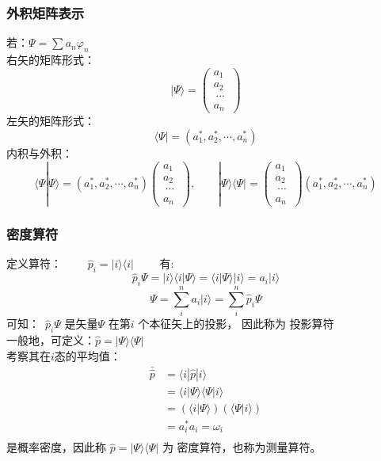 \begin{frame}
    \frametitle{外积矩阵表示}
    若：$ \Psi =\sum a_n \varphi_n $\\
    右矢的矩阵形式：
    $$|\Psi\rangle = \begin{pmatrix}
        a_1\\
        a_2\\\
        \cdots\\
        a_n\
    \end{pmatrix}$$ 
    左矢的矩阵形式：
    $$ \langle\Psi| = (a_1 ^*, a_2 ^*, \cdots, a_n ^*) $$
    内积与外积：
    $$\langle\Psi|\Psi\rangle= (a_1 ^*, a_2 ^*, \cdots, a_n ^*) \begin{pmatrix}
        a_1\\
        a_2\\\
        \cdots\\
        a_n\
    \end{pmatrix},\qquad  |\Psi\rangle\langle\Psi|= \begin{pmatrix}
        a_1\\
        a_2\\\
        \cdots\\
        a_n\
    \end{pmatrix} (a_1 ^*, a_2 ^*, \cdots, a_n ^*) $$
\end{frame} 

\begin{frame}
    \frametitle{密度算符}
    定义算符： $ \qquad  \hat{p}_i = |i\rangle\langle i | \qquad $ 有: 
    $$ \hat{p}_i\Psi= |i\rangle\langle i | \Psi \rangle = \langle i | \Psi \rangle |i\rangle=a_i |i\rangle $$
    $$\Psi= \sum\limits_i ^n a_i |i\rangle = \sum\limits_i ^n \hat{p}_i\Psi$$
    可知： $ \hat{p}_i\Psi $ 是矢量$\Psi$ 在第$i$ 个本征矢上的投影， 因此称为{\color{red} 投影算符}\\
    一般地，可定义：$\hat{p} = |\Psi\rangle\langle \Psi |$\\
    考察其在$i$态的平均值：
    $$ \begin{aligned}
    \bar{\hat{p}} &=\langle i |\hat{p} | i \rangle \\
               &=\langle i |\Psi\rangle\langle \Psi | i \rangle \\
               &=(\langle i |\Psi\rangle) (\langle \Psi | i \rangle) \\
               &=a_i ^* a_i =\omega_i \\
    \end{aligned} $$
    是概率密度，因此称 $\hat{p} = |\Psi\rangle\langle \Psi |$ 为 {\color{red} 密度算符}，也称为测量算符。
\end{frame} 
 
